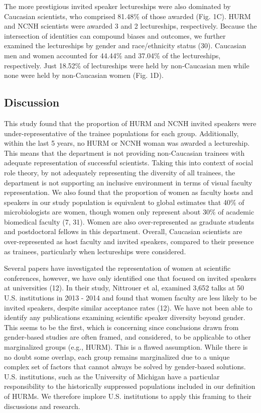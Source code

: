\documentclass[10pt,]{article}
\begin{document}
The more prestigious invited speaker lectureships were also dominated by
Caucasian scientists, who comprised 81.48\% of those awarded (Fig. 1C).
HURM and NCNH scientists were awarded 3 and 2 lectureships,
respectively. Because the intersection of identities can compound biases
and outcomes, we further examined the lectureships by gender and
race/ethnicity status (30). Caucasian men and women accounted for
44.44\% and 37.04\% of the lectureships, respectively. Just 18.52\% of
lectureships were held by non-Caucasian men while none were held by
non-Caucasian women (Fig. 1D).

\subsection{Discussion}\label{discussion}

This study found that the proportion of HURM and NCNH invited speakers
were under-representative of the trainee populations for each group.
Additionally, within the last 5 years, no HURM or NCNH woman was awarded
a lectureship. This means that the department is not providing
non-Caucasian trainees with adequate representation of successful
scientists. Taking this into context of social role theory, by not
adequately representing the diversity of all trainees, the department is
not supporting an inclusive environment in terms of visual faculty
representation. We also found that the proportion of women as faculty
hosts and speakers in our study population is equivalent to global
estimates that 40\% of microbiologists are women, though women only
represent about 30\% of academic biomedical faculty (7, 31). Women are
also over-represented as graduate students and postdoctoral fellows in
this department. Overall, Caucasian scientists are over-represented as
host faculty and invited speakers, compared to their presence as
trainees, particularly when lectureships were considered.

Several papers have investigated the representation of women at
scientific conferences, however, we have only identified one that
focused on invited speakers at universities (12). In their study,
Nittrouer et al, examined 3,652 talks at 50 U.S. institutions in 2013 -
2014 and found that women faculty are less likely to be invited
speakers, despite similar acceptance rates (12). We have not been able
to identify any publications examining scientific speaker diversity
beyond gender. This seems to be the first, which is concerning since
conclusions drawn from gender-based studies are often framed, and
considered, to be applicable to other marginalized groups (e.g., HURM).
This is a flawed assumption. While there is no doubt some overlap, each
group remains marginalized due to a unique complex set of factors that
cannot always be solved by gender-based solutions. U.S. institutions,
such as the University of Michigan have a particular responsibility to
the historically suppressed populations included in our definition of
HURMs. We therefore implore U.S. institutions to apply this framing to
their discussions and research.
\end{document}
